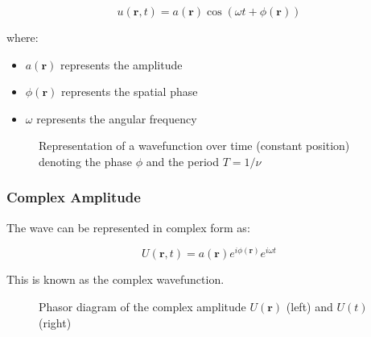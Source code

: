 \documentclass[
  a4paper,
]{book}
\providecommand{\tightlist}{%
  \setlength{\itemsep}{0pt}\setlength{\parskip}{0pt}}
\begin{document}
\[u(\mathbf{r},t)=a(\mathbf{r})\cos(\omega t + \phi(\mathbf{r}))\]

where:

\begin{itemize}
\tightlist
\item
  \(a(\mathbf{r})\) represents the amplitude
\item
  \(\phi(\mathbf{r})\) represents the spatial phase
\item
  \(\omega\) represents the angular frequency
\end{itemize}

\begin{figure}


\caption{\label{fig-wave}Representation of a wavefunction over time
(constant position) denoting the phase \(\phi\) and the period
\(T=1/\nu\)}

\end{figure}%

\subsubsection{Complex Amplitude}\label{complex-amplitude}

The wave can be represented in complex form as:

\[
U(\mathbf{r},t)=a(\mathbf{r})e^{i\phi(\mathbf{r})}e^{i\omega t}
\]

This is known as the complex wavefunction.

\begin{figure}


\caption{\label{fig-complex-rep}Phasor diagram of the complex amplitude
\(U(\mathbf{r})\) (left) and \(U(t)\) (right)}

\end{figure}%
\end{document}
